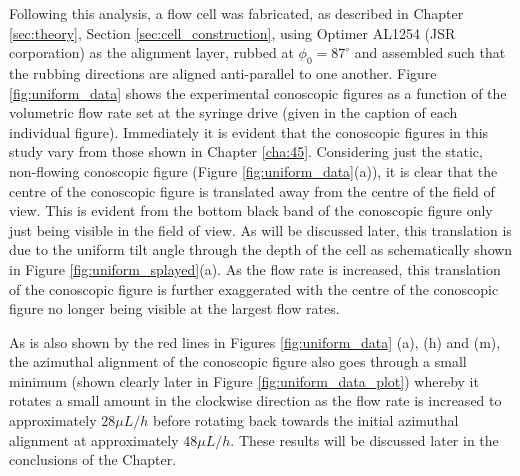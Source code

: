 Following this analysis, a flow cell was fabricated, as described in Chapter \ref{sec:theory}, Section \ref{sec:cell_construction}, using Optimer AL1254 (JSR corporation) as the alignment layer, rubbed at $\phi_0=87^{\circ}$ and assembled such that the rubbing directions are aligned anti-parallel to one another. Figure \ref{fig:uniform_data} shows the experimental conoscopic figures as a function of the volumetric flow rate set at the syringe drive (given in the caption of each individual figure). Immediately it is evident that the conoscopic figures in this study vary from those shown in Chapter \ref{cha:45}. Considering just the static, non-flowing conoscopic figure (Figure \ref{fig:uniform_data}(a)), it is clear that the centre of the conoscopic figure is translated away from the centre of the field of view. This is evident from the bottom black band of the conoscopic figure only just being visible in the field of view. As will be discussed later, this translation is due to the uniform tilt angle through the depth of the cell as schematically shown in Figure \ref{fig:uniform_splayed}(a). As the flow rate is increased, this translation of the conoscopic figure is further exaggerated with the centre of the conoscopic figure no longer being visible at the largest flow rates. 

As is also shown by the red lines in Figures \ref{fig:uniform_data} (a), (h) and (m), the azimuthal alignment of the conoscopic figure also goes through a small minimum (shown clearly later in Figure \ref{fig:uniform_data_plot}) whereby it rotates a small amount in the clockwise direction as the flow rate is increased to approximately $28\mu L/h$ before rotating back towards the initial azimuthal alignment at approximately $48\mu L/h$. These results will be discussed later in the conclusions of the Chapter.


